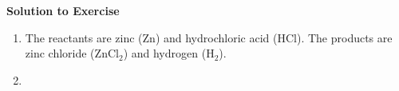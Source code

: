 {\begin{mdframed}[linewidth=4, leftmargin=40, rightmargin=40]
\begin{exercise}
      \vspace{5pt}
      \label{m38727*solfhsst!!!underscore!!!id972}\noindent\textbf{Solution to Exercise } \label{m38727*listfhsst!!!underscore!!!id972}\begin{enumerate}[noitemsep, label=\textbf{Step} \textbf{\arabic*}. ] 
            \leftskip=20pt\rightskip=\leftskip\item  
      \label{m38727*id66103}The reactants are zinc (\begin{math}\mathrm{Zn}\end{math}) and hydrochloric acid (\begin{math}\mathrm{HCl}\end{math}). The products are zinc chloride (\begin{math}\mathrm{ZnCl}{}_{2}\end{math}) and hydrogen (\begin{math}\mathrm{H}{}_{2}\end{math}).\par 
      \item  
      \label{m38727*id66139}\nopagebreak\noindent{}
    


\end{enumerate}
\end{exercise}
\end{mdframed}}
